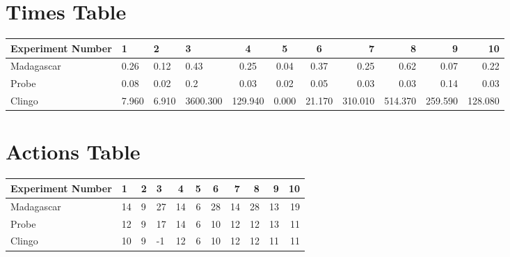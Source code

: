 \documentclass[8pt]{article}
\begin{document}
\begin{landscape}
\section{Times Table}\begin{tabular}{ | l | l | l | l | c | c | c | r | r | r | r | }\hline
Experiment Number & 1 & 2 & 3 & 4 & 5 & 6 & 7 & 8 & 9 & 10\\  \hline
Madagascar & 0.26 & 0.12 & 0.43 & 0.25 & 0.04 & 0.37 & 0.25 & 0.62 & 0.07 & 0.22\\  \hline
Probe & 0.08 & 0.02 & 0.2 & 0.03 & 0.02 & 0.05 & 0.03 & 0.03 & 0.14 & 0.03\\  \hline
Clingo & 7.960 & 6.910 & 3600.300 & 129.940 & 0.000 & 21.170 & 310.010 & 514.370 & 259.590 & 128.080\\  \hline
\end{tabular}
\section{Actions Table}\begin{tabular}{ | l | l | l | l | c | c | c | r | r | r | r | }\hline
Experiment Number & 1 & 2 & 3 & 4 & 5 & 6 & 7 & 8 & 9 & 10\\ \hline
 Madagascar & 14 & 9 & 27 & 14 & 6 & 28 & 14 & 28 & 13 & 19\\ \hline
 Probe & 12 & 9 & 17 & 14 & 6 & 10 & 12 & 12 & 13 & 11\\ \hline
 Clingo & 10 & 9 & -1 & 12 & 6 & 10 & 12 & 12 & 11 & 11\\ \hline
\end{tabular}
\end{landscape}
\end{document}
